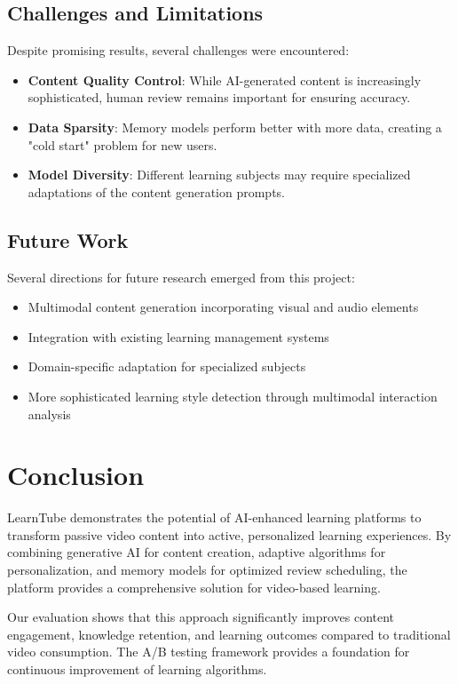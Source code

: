 \documentclass[conference]{IEEEtran}
\begin{document}
\subsection{Challenges and Limitations}
Despite promising results, several challenges were encountered:

\begin{itemize}
    \item \textbf{Content Quality Control}: While AI-generated content is increasingly sophisticated, human review remains important for ensuring accuracy.
    \item \textbf{Data Sparsity}: Memory models perform better with more data, creating a "cold start" problem for new users.
    \item \textbf{Model Diversity}: Different learning subjects may require specialized adaptations of the content generation prompts.
\end{itemize}

\subsection{Future Work}
Several directions for future research emerged from this project:

\begin{itemize}
    \item Multimodal content generation incorporating visual and audio elements
    \item Integration with existing learning management systems
    \item Domain-specific adaptation for specialized subjects
    \item More sophisticated learning style detection through multimodal interaction analysis
\end{itemize}

\section{Conclusion}
LearnTube demonstrates the potential of AI-enhanced learning platforms to transform passive video content into active, personalized learning experiences. By combining generative AI for content creation, adaptive algorithms for personalization, and memory models for optimized review scheduling, the platform provides a comprehensive solution for video-based learning.

Our evaluation shows that this approach significantly improves content engagement, knowledge retention, and learning outcomes compared to traditional video consumption. The A/B testing framework provides a foundation for continuous improvement of learning algorithms.
\end{document}
